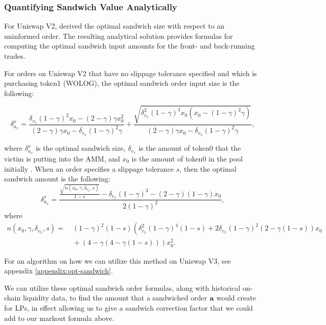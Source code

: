     \subsubsection{Quantifying Sandwich Value Analytically}
        For Uniswap V2, \cite{heimbach2022eliminating} derived the optimal sandwich size with respect to an uninformed order. The resulting analytical solution provides formulas for computing the optimal sandwich input amounts for the front- and back-running trades.

        For orders on Uniswap V2 that have no slippage tolerance specified and which is purchasing token1 (WOLOG), the optimal sandwich order input size is the following:

        \begin{equation*}
            \delta^o_{a_x} = 
                \frac{\delta_{v_x}(1-\gamma)^2x_0 - (2-\gamma)\gamma x_0^2}{(2-\gamma)\gamma x_0 - \delta_{v_x}(1-\gamma)^2\gamma} 
                + \frac{\sqrt{\delta_{v_x}^2 (1-\gamma)^3x_0(x_0-(1-\gamma)^2\gamma)}}{(2-\gamma)\gamma x_0 - \delta_{v_x}(1-\gamma)^2\gamma},
        \end{equation*}

        where $\delta^o_{a_x}$ is the optimal sandwich size, $\delta_{v_x}$ is the amount of token0 that the victim is putting into the AMM, and $x_0$ is the amount of token0 in the pool initially \cite{heimbach2022eliminating}. When an order specifies a slippage tolerance $s$, then the optimal sandwich amount is the following:
        \begin{equation*}
            \delta_{a_x}^s=\frac{\frac{\sqrt{n\left(x_0, \gamma, \delta_{v_x}, s\right)}}{1-s}-\delta_{v_x}(1-\gamma)^3-(2-\gamma)(1-\gamma) x_0}{2(1-\gamma)^2},
        \end{equation*}
        where
        \begin{align*}
            n\left(x_0, \gamma, \delta_{v_x}, s\right) = &  \ (1-\gamma)^2(1-s)\left(\delta_{v_x}^2(1-\gamma)^4(1-s)\right. 
             +2 \delta_{v_x}(1-\gamma)^2(2-\gamma(1-s)) x_0 \\
            & \ + (4-\gamma(4-\gamma(1-s))) x_0^2.
        \end{align*}
        
        For an algorithm on how we can utilize this method on Uniswap V3, see appendix \ref{appendix:opt-sandwich}.

        We can utilize these optimal sandwich order formulas, along with historical on-chain liquidity data, to find the amount that a sandwiched order $\textbf a$  would create for LPs, in effect allowing us to give a sandwich correction factor that we could add to our markout formula above. 

